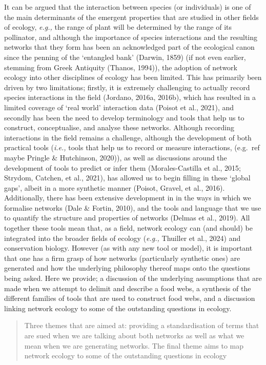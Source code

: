 \documentclass[
]{article}
\begin{document}
It can be argued that the interaction between species (or individuals)
is one of the main determinants of the emergent properties that are
studied in other fields of ecology, \emph{e.g.,} the range of plant will
be determined by the range of its pollinator, and although the
importance of species interactions and the resulting networks that they
form has been an acknowledged part of the ecological canon since the
penning of the `entangled bank' (Darwin, 1859) (if not even earlier,
stemming from Greek Antiquity (Thanos, 1994)), the adoption of network
ecology into other disciplines of ecology has been limited. This has
primarily been driven by two limitations; firstly, it is extremely
challenging to actually record species interactions in the field
(Jordano, 2016a, 2016b), which has resulted in a limited coverage of
`real world' interaction data (Poisot et al., 2021), and secondly has
been the need to develop terminology and tools that help us to
construct, conceptualise, and analyse these networks. Although recording
interactions in the field remains a challenge, although the development
of both practical tools (\emph{i.e.,} tools that help us to record or
measure interactions, (e.g.~ref maybe Pringle \& Hutchinson, 2020)), as
well as discussions around the development of tools to predict or infer
them (Morales-Castilla et al., 2015; Strydom, Catchen, et al., 2021),
has allowed us to begin filling in these `global gaps', albeit in a more
synthetic manner (Poisot, Gravel, et al., 2016). Additionally, there has
been extensive development in in the ways in which we formalise networks
(Dale \& Fortin, 2010), and the tools and language that we use to
quantify the structure and properties of networks (Delmas et al., 2019).
All together these tools mean that, as a field, network ecology can (and
should) be integrated into the broader fields of ecology (\emph{e.g.,}
Thuiller et al., 2024) and conservation biology. However (as with any
new tool or model), it is important that one has a firm grasp of how
networks (particularly synthetic ones) are generated and how the
underlying philosophy thereof maps onto the questions being asked. Here
we provide; a discussion of the underlying assumptions that are made
when we attempt to delimit and describe a food webs, a synthesis of the
different families of tools that are used to construct food webs, and a
discussion linking network ecology to some of the outstanding questions
in ecology.

\begin{quote}
Three themes that are aimed at: providing a standardisation of terms
that are sued when we are talking about both networks as well as what we
mean when we are generating networks. The final theme aims to map
network ecology to some of the outstanding questions in ecology
\end{quote}
\end{document}
